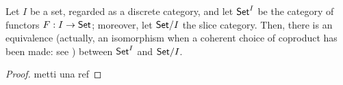 \begin{proposition}\label{variabbo_set}
	Let $I$ be a set, regarded as a discrete category, and let $\mathsf{Set}^I$ be the category of functors $F : I \to \mathsf{Set}$; moreover, let $\mathsf{Set}/I$ the slice category. Then, there is an equivalence (actually, an isomorphism when a coherent choice of coproduct has been made: see \cite[1.5.1]{Bor1}) between $\mathsf{Set}^I$ and $\mathsf{Set}/I$.
\end{proposition}
\begin{proof}
	{\color{red} metti una ref}




\end{proof}
